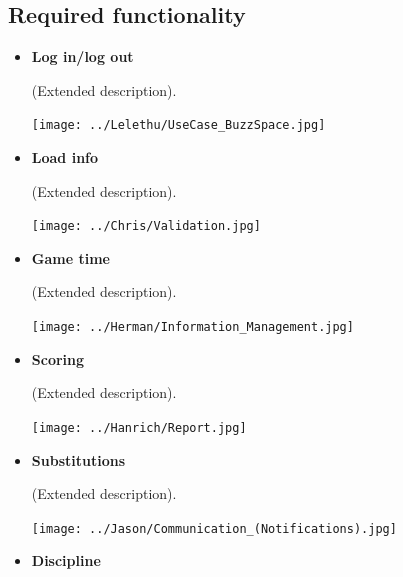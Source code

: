 \documentclass[a4paper,12pt]{report}
\begin{document}
{\begin{itemize}
\subsection{Required functionality}
\begin{itemize}
	\item \textbf{Log in/log out}
		\begin{flushleft}
		 (Extended description).	
		\end{flushleft}
		\begin{center}
  	 	\texttt{[image: ../Lelethu/UseCase\_BuzzSpace.jpg]}\\[0.4cm]    
		\end{center}
\newpage
\item \textbf{Load info}
		\begin{flushleft}
		 (Extended description).	
		\end{flushleft}
		\begin{center}
  	 	\texttt{[image: ../Chris/Validation.jpg]}\\[0.4cm]    
		\end{center}
\item  \textbf{Game time}
		\begin{flushleft}
		 (Extended description).	
		\end{flushleft}
		\begin{center}
  	 	\texttt{[image: ../Herman/Information\_Management.jpg]}\\[0.4cm]    
		\end{center}
\item \textbf{Scoring}
		\begin{flushleft}
		 (Extended description).	
		\end{flushleft}
		\begin{center}
  	 	\texttt{[image: ../Hanrich/Report.jpg]}\\[0.4cm]    
		\end{center}
\newpage
	\item \textbf{Substitutions}
		\begin{flushleft}
		 (Extended description).
		\end{flushleft}
		\begin{center}
		\texttt{[image: ../Jason/Communication\_(Notifications).jpg]}\\[0.4cm]
		\end{center}
	\item \textbf{Discipline}
		\begin{flushleft}

\end{flushleft}
\end{itemize}
\end{itemize}}
\end{document}
